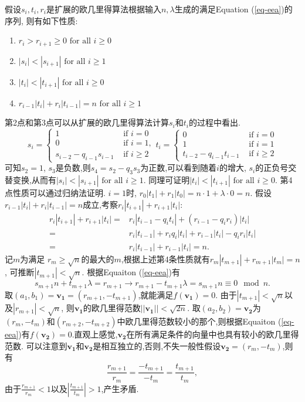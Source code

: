 \documentclass{article}
\begin{document}
假设$s_i, t_i, r_i$是扩展的欧几里得算法根据输入$n, \lambda$生成的满足Equation (\ref{eq-eea})的序列,
则有如下性质:
\begin{enumerate}
\item $r_i > r_{i+1} \ge 0 \text{ for all } i \ge 0$
\item $|s_i| < |s_{i+1}| \text{ for all } i \ge 1$
\item $|t_i| < |t_{i+1}| \text{ for all } i \ge 0$
\item $r_{i-1}|t_i| + r_i|t_{i-1}| = n \text{ for all } i \ge 1$
\end{enumerate}
第2点和第3点可以从扩展的欧几里得算法计算$s_i$和$t_i$的过程中看出.
\begin{equation}\nonumber
s_i = \left\{
\begin{array}{ll}
1 & \text{ if } i = 0 \\
0 & \text{ if } i = 1, \\
s_{i-2} - q_{i-1}s_{i-1} & \text{ if } i \ge 2 
\end{array}
\right. 
t_i = \left\{
\begin{array}{ll}
0 & \text{ if } i = 0 \\
1 & \text{ if } i = 1 \\
t_{i-2} - q_{i-1}t_{i-1} & \text{ if } i \ge 2 
\end{array}
\right.
\end{equation}
可知$s_2 = 1$, $s_3$是负数,则$s_4 = s_2 - q_3s_3$为正数,可以看到随着$i$的增大,
$s_i$的正负号交替变换,从而有$|s_i| < |s_{i+1}| \text{ for all } i \ge 1$.
同理可证明$|t_i| < |t_{i+1}| \text{ for all } i \ge 0$.
第4点性质可以通过归纳法证明. $i = 1$时, $r_0|t_1| + r_1|t_0| = n \cdot 1 + \lambda \cdot 0 = n$.
假设$r_{i-1}|t_i| + r_i|t_{i-1}| = n$成立,考察$r_{i}|t_{i+1}| + r_{i+1}|t_{i}|$:
\begin{equation}\nonumber
\begin{split}
r_{i}|t_{i+1}| + r_{i+1}|t_{i}| = & r_{i}|t_{i-1} - q_{i}t_{i}| + (r_{i-1}-q_{i}r_{i})|t_{i}| \\
= & r_i|t_{i-1}| + r_iq_i|t_i| + r_{i-1}|t_i| - q_ir_i|t_i|\\
= & r_i|t_{i-1}|+ r_{i-1}|t_i| = n.
\end{split}
\end{equation}
记$m$为满足 $r_m \ge \sqrt{n}$的最大的$m$,根据上述第4条性质就有$r_m|t_{m+1}| + r_{m+1}|t_m| = n$, 可推断$|t_{m+1}|<\sqrt{n}$.
根据Equaiton (\ref{eq-eea})有
$$s_{m+1}n + t_{m+1}\lambda = r_{m+1} \rightarrow r_{m+1} - t_{m+1} \lambda = s_{m+1} n \equiv 0 \mod n.$$
取$(a_1, b_1) = \mathbf{v_1}  = (r_{m+1}, - t_{m+1})$,就能满足$f(\mathbf{v_1}) = 0$.
由于$|t_{m+1}|<\sqrt{n}$以及$|r_{m+1}| < \sqrt{n}$, 则$\mathbf{v_1}$的欧几里得范数$||\mathbf{v_1}|| <\sqrt{2n}$.
取$(a_2, b_2) = \mathbf{v_2}$为$(r_{m}, - t_{m})$和$(r_{m+2}, - t_{m+2})$中欧几里得范数较小的那个,则根据Equaiton (\ref{eq-eea})有$f(\mathbf{v_2}) = 0$.直观上感觉,$\mathbf{v_2}$在所有满足条件的向量中也具有较小的欧几里得范数.
可以注意到$\mathbf{v_1}$和$\mathbf{v_2}$是相互独立的,否则,不失一般性假设$\mathbf{v_2}=(r_m,-t_m)$,则有
$$
\dfrac{r_{m+1}}{r_m} = \dfrac{-t_{m+1}}{-t_m} = \dfrac{t_{m+1}}{t_m},
$$
由于$\frac{r_{m+1}}{r_m} < 1$以及$|\frac{t_{m+1}}{t_m}| > 1$,产生矛盾.
\end{document}

